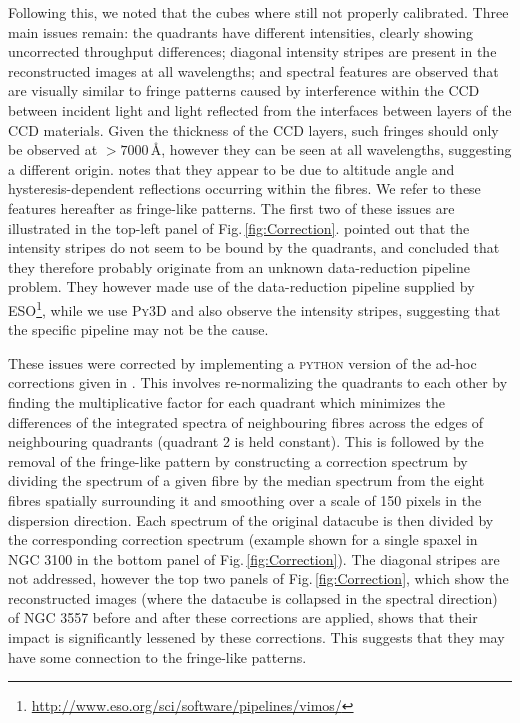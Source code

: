 		Following this, we noted that the cubes where still not properly calibrated. Three main issues remain: the quadrants have different intensities, clearly showing uncorrected throughput differences; diagonal intensity stripes are present in the reconstructed images at all wavelengths; and spectral features are observed \citep{Jullo2008} that are visually similar to fringe patterns caused by interference within the CCD between incident light and light reflected from the interfaces between layers of the CCD materials. Given the thickness of the CCD layers, such fringes should only be observed at $>7000$\,\AA, however they can be seen at all wavelengths, suggesting a different origin. \citet{Lagerholm2012} notes that they appear to be due to altitude angle and hysteresis-dependent reflections occurring within the fibres. We refer to these features hereafter as fringe-like patterns. The first two of these issues are illustrated in the top-left panel of Fig.\,\ref{fig:Correction}. \citet{Lagerholm2012} pointed out that the intensity stripes do not seem to be bound by the quadrants, and concluded that they therefore probably originate from an unknown data-reduction pipeline problem. They however made use of the data-reduction pipeline supplied by ESO\footnote{\url{http://www.eso.org/sci/software/pipelines/vimos/}}, while we use \textsc{Py3D} and also observe the intensity stripes, suggesting that the specific pipeline may not be the cause.  

		These issues were corrected by implementing a \textsc{python} version of the ad-hoc corrections given in \citet{Lagerholm2012}. This involves re-normalizing the quadrants to each other by finding the multiplicative factor for each quadrant which minimizes the differences of the integrated spectra of neighbouring fibres across the edges of neighbouring quadrants (quadrant 2 is held constant). This is followed by the removal of the fringe-like pattern by constructing a correction spectrum by dividing the spectrum of a given fibre by the median spectrum from the eight fibres spatially surrounding it and smoothing over a scale of 150 pixels in the dispersion direction. Each spectrum of the original datacube is then divided by the corresponding correction spectrum (example shown for a single spaxel in NGC 3100 in the bottom panel of Fig.\,\ref{fig:Correction}). The diagonal stripes are not addressed, however the top two panels of Fig.\,\ref{fig:Correction}, which show the reconstructed images (where the datacube is collapsed in the spectral direction) of NGC 3557 before and after these corrections are applied, shows that their impact is significantly lessened by these corrections. This suggests that they may have some connection to the fringe-like patterns. 

